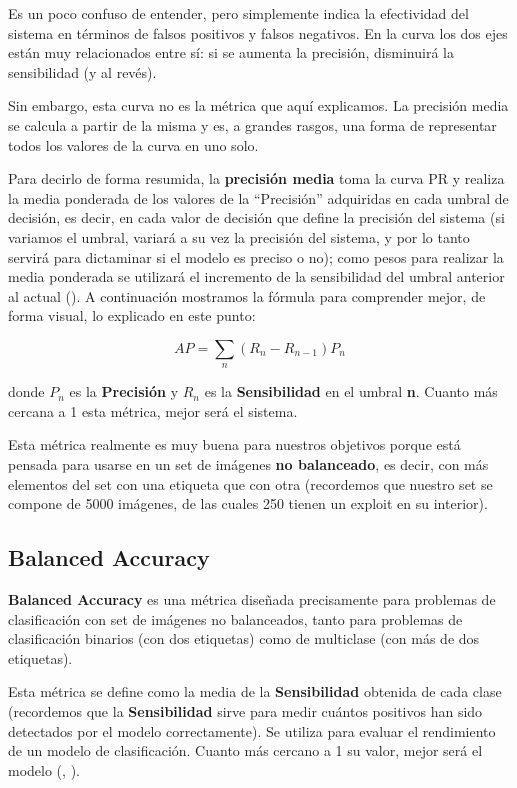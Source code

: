 Es un poco confuso de entender, pero simplemente indica la efectividad del sistema en términos de falsos positivos y falsos negativos. En la curva los dos ejes están muy relacionados entre sí: si se aumenta la precisión, disminuirá la sensibilidad (y al revés).

Sin embargo, esta  curva no es la métrica que aquí explicamos. La precisión media se calcula a partir de la misma y es, a grandes rasgos, una forma de representar todos los valores de la curva en uno solo.

Para decirlo de forma resumida, la \textbf{precisión media} toma la curva \ac{PR} y realiza la media ponderada de los valores de la ``Precisión'' adquiridas en cada umbral de decisión, es decir, en cada valor de decisión que define la precisión del sistema (si variamos el umbral, variará a su vez la precisión del sistema, y por lo tanto servirá para dictaminar si el modelo es preciso o no); como pesos para realizar la media ponderada se utilizará el incremento de la sensibilidad del umbral anterior al actual (\cite{apscore}). A continuación mostramos la fórmula para comprender mejor, de forma visual, lo explicado en este punto: %

\begin{equation}\label{eq:apscore}
AP = \sum_{n}(R_n - R_{n-1})P_n
\end{equation}

donde $P_n$ es la \textbf{Precisión} y $R_n$ es la \textbf{Sensibilidad} en el umbral \textbf{n}. Cuanto más cercana a 1 esta métrica, mejor será el sistema.

Esta métrica realmente es muy buena para nuestros objetivos porque está pensada para usarse en un set de imágenes \textbf{no balanceado}, es decir, con más elementos del set con una etiqueta que con otra (recordemos que nuestro set se compone de 5000 imágenes, de las cuales 250 tienen un exploit en su interior).

\subsection{Balanced Accuracy}

\textbf{Balanced Accuracy} es una métrica diseñada precisamente para problemas de clasificación con set de imágenes no balanceados, tanto para problemas de clasificación binarios (con dos etiquetas) como de multiclase (con más de dos etiquetas).

Esta métrica se define como la media de la \textbf{Sensibilidad} obtenida de cada clase (recordemos que la \textbf{Sensibilidad} sirve para medir cuántos positivos han sido detectados por el modelo correctamente). Se utiliza para evaluar el rendimiento de un modelo de clasificación. Cuanto más cercano a 1 su valor, mejor será el modelo (\cite{balanced-accuracy}, \cite{balanced-accuracy-2}). %

